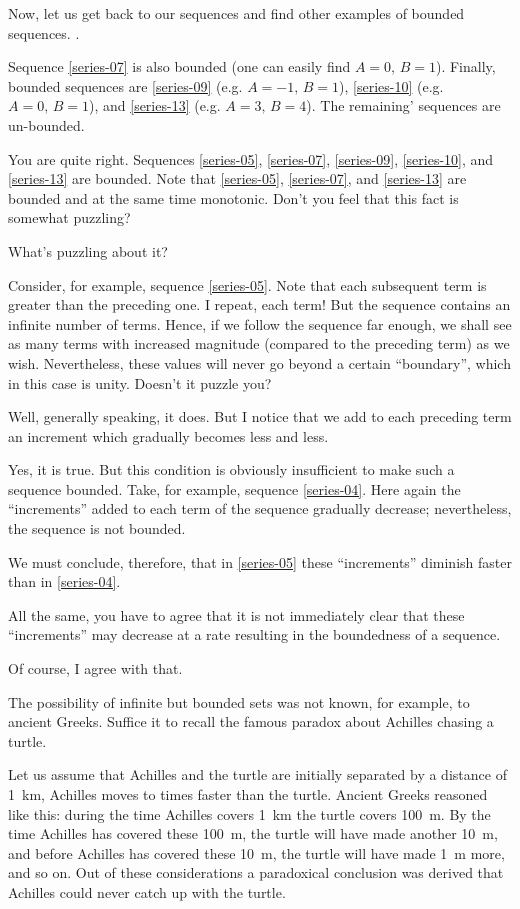 {Now, let us get back to our sequences and find other examples of bounded sequences.	 .

\rdr Sequence \eqref{series-07} is also bounded (one can easily find $A = 0, \, B = 1$). Finally, bounded sequences are \eqref{series-09} (e.g. $A=-1, \,B= 1$), \eqref{series-10} (e.g. $A=0, \, B= 1$), and \eqref{series-13} (e.g. $A = 3, \, B = 4$). The remaining' sequences are un-bounded.

\athr You are quite right. Sequences \eqref{series-05}, \eqref{series-07}, \eqref{series-09}, \eqref{series-10}, and \eqref{series-13} are bounded. Note that \eqref{series-05}, \eqref{series-07}, and \eqref{series-13} are bounded and at the same time monotonic. Don't you feel that this fact is somewhat puzzling?

\rdr What's puzzling about it?

\athr Consider, for example, sequence \eqref{series-05}. Note that each subsequent term is greater than the preceding one. I repeat, each term! But the sequence contains an infinite number of terms. Hence, if we follow the sequence far enough, we shall see as many terms with increased magnitude (compared to the preceding term) as we wish. Nevertheless, these values will never go beyond a certain ``boundary'', which in this case is unity. Doesn't it puzzle you?

\rdr Well, generally speaking, it does. But I notice that we add to each preceding term an increment which gradually becomes less and less.

\athr Yes, it is true. But this condition is obviously insufficient to make such a sequence bounded. Take, for example, sequence \eqref{series-04}. Here again the ``increments'' added to each term of the sequence gradually decrease; nevertheless, the sequence is not bounded.

\rdr We must conclude, therefore, that in \eqref{series-05} these ``increments'' diminish faster than in \eqref{series-04}.

\athr All the same, you have to agree that it is not immediately clear that these ``increments'' may decrease at a rate resulting in the boundedness of a sequence.

\rdr Of course, I agree with that.

\athr The possibility of infinite but bounded sets was not known, for example, to ancient Greeks. Suffice it to recall the famous paradox about Achilles chasing a turtle.

Let us assume that Achilles and the turtle are initially separated by a distance of \SI{1}{\kilo\meter}, Achilles moves to times faster than the turtle. Ancient Greeks reasoned like this: during the time Achilles covers \SI{1}{\kilo\meter} the turtle covers \SI{100}{\meter}. By the time Achilles has covered these \SI{100}{\meter}, the turtle will have made another \SI{10}{\meter}, and before Achilles has covered these \SI{10}{\meter}, the turtle will have made \SI{1}{\meter} more, and so on. Out of these considerations a paradoxical conclusion was derived that Achilles could never catch up with the turtle.

}
